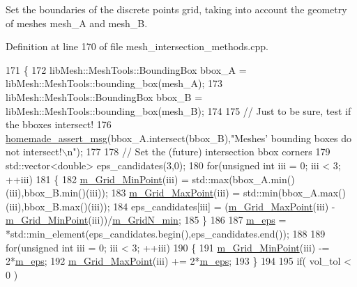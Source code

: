 Set the boundaries of the discrete points grid, taking into account the geometry of meshes mesh\+\_\+\+A and mesh\+\_\+\+B. 



Definition at line 170 of file mesh\+\_\+intersection\+\_\+methods.\+cpp.


\begin{DoxyCode}
171 \{
172     libMesh::MeshTools::BoundingBox bbox\_A = libMesh::MeshTools::bounding\_box(mesh\_A);
173     libMesh::MeshTools::BoundingBox bbox\_B = libMesh::MeshTools::bounding\_box(mesh\_B);
174 
175     \textcolor{comment}{// Just to be sure, test if the bboxes intersect!}
176     \hyperlink{common__header_8h_a593ccc80b790b2268653fcf6597bf451}{homemade\_assert\_msg}(bbox\_A.intersect(bbox\_B),\textcolor{stringliteral}{"Meshes' bounding boxes do not
       intersect!\(\backslash\)n"});
177 
178     \textcolor{comment}{// Set the (future) intersection bbox corners}
179     std::vector<double> eps\_candidates(3,0);
180     \textcolor{keywordflow}{for}(\textcolor{keywordtype}{unsigned} \textcolor{keywordtype}{int} iii = 0; iii < 3; ++iii)
181     \{
182         \hyperlink{classcarl_1_1_mesh___intersection_a415abd921fae83d405751d1dcc0957db}{m\_Grid\_MinPoint}(iii) = std::max(bbox\_A.min()(iii),bbox\_B.min()(iii));
183         \hyperlink{classcarl_1_1_mesh___intersection_a98f86004df38485ed880b054b94f5c7d}{m\_Grid\_MaxPoint}(iii) = std::min(bbox\_A.max()(iii),bbox\_B.max()(iii));
184         eps\_candidates[iii] = (\hyperlink{classcarl_1_1_mesh___intersection_a98f86004df38485ed880b054b94f5c7d}{m\_Grid\_MaxPoint}(iii) - 
      \hyperlink{classcarl_1_1_mesh___intersection_a415abd921fae83d405751d1dcc0957db}{m\_Grid\_MinPoint}(iii))/\hyperlink{classcarl_1_1_mesh___intersection_af5d973b0c2505d89bf1c9f7b29585b80}{m\_GridN\_min};
185     \}
186 
187     \hyperlink{classcarl_1_1_mesh___intersection_a2b2a46afcfa01b2763315f439bd0a4d6}{m\_eps} = *std::min\_element(eps\_candidates.begin(),eps\_candidates.end());
188 
189     \textcolor{keywordflow}{for}(\textcolor{keywordtype}{unsigned} \textcolor{keywordtype}{int} iii = 0; iii < 3; ++iii)
190     \{
191         \hyperlink{classcarl_1_1_mesh___intersection_a415abd921fae83d405751d1dcc0957db}{m\_Grid\_MinPoint}(iii) -= 2*\hyperlink{classcarl_1_1_mesh___intersection_a2b2a46afcfa01b2763315f439bd0a4d6}{m\_eps};
192         \hyperlink{classcarl_1_1_mesh___intersection_a98f86004df38485ed880b054b94f5c7d}{m\_Grid\_MaxPoint}(iii) += 2*\hyperlink{classcarl_1_1_mesh___intersection_a2b2a46afcfa01b2763315f439bd0a4d6}{m\_eps};
193     \}
194 
195     \textcolor{keywordflow}{if}( vol\_tol < 0 )

\end{DoxyCode}
